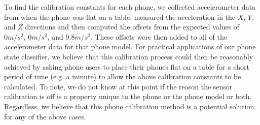 \begin{figure}[h]
\begin{center}
 \scalebox{0.375}{}
  \scalebox{0.375}{}
  \scalebox{0.375}{}
\label{fig:accelGraph}
\end{center}
\end{figure}


To find the calibration constants for each phone, we collected accelerometer
data from when the phone was flat on a table, measured the acceleration in the
$X$, $Y$, and $Z$ directions and then computed the offsets from the expected values of
$0m/s^2$, $0m/s^2$, and $9.8m/s^2$. 
These offsets were then added to all of the accelerometer data for that phone model.
For practical applications of our phone state classifier, we believe that this calibration process
could then be reasonably achieved by asking phone users to place their phones flat on a table for a short period of time (e.g. a minute)
to allow the above calibration constants to be calculated.
To note, we do not know at this point if the reason the sensor calibration is off is a property unique to the phone or the phone model or both.
Regardless, we believe that this phone calibration method is a potential solution for any of the above cases.  


